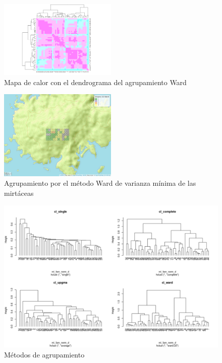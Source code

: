 \documentclass[11pt,]{article}
\begin{document}
\begin{figure}
\centering
\includegraphics[width=0.50000\textwidth]{Mapadecalor_Ward_aa2.png}
\caption{Mapa de calor con el dendrograma del agrupamiento Ward
\label{fig:mapadecalor_ward}}
\end{figure}

\begin{figure}
\centering
\includegraphics[width=0.50000\textwidth]{mapa_ward_k4.png}
\caption{Agrupamiento por el método Ward de varianza mínima de las
mirtáceas \label{fig:mapa_ward}}
\end{figure}

\begin{figure}
\centering
\includegraphics{metodosdeagrupamiento.png}
\caption{Métodos de agrupamiento \label{fig:metodosdeagrupamiento}}
\end{figure}
\end{document}
